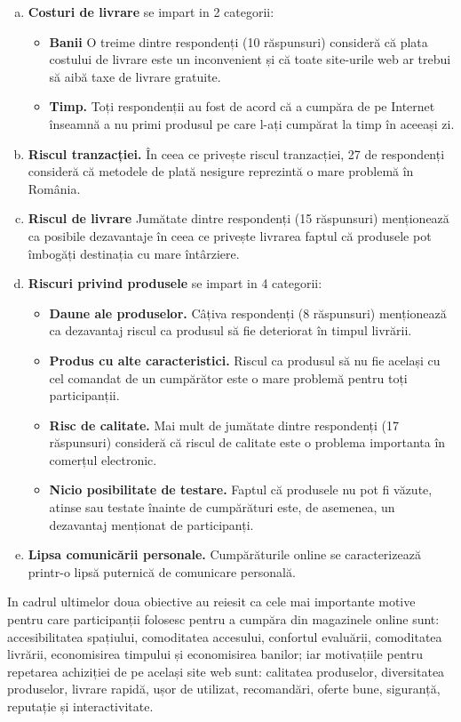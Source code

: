 \documentclass[a4paper, 12pt]{article}
\begin{document}
	\begin{enumerate}[a.]
		\item \textbf {Costuri de livrare} se impart in 2 categorii:
	\begin{itemize}
		\item\textbf{Banii} O treime dintre respondenți (10 răspunsuri) consideră că plata costului de livrare este un inconvenient și că toate site-urile web ar trebui să aibă taxe de livrare gratuite.
		\item\textbf{Timp.} Toți respondenții au fost de acord că a cumpăra de pe Internet înseamnă a nu primi produsul pe care l-ați cumpărat la timp în aceeași zi.
	\end{itemize}
	\item\textbf{Riscul tranzacției.} În ceea ce privește riscul tranzacției, 27 de respondenți consideră că metodele de plată nesigure reprezintă o mare problemă în România.
	\item\textbf {Riscul de livrare}
		Jumătate dintre respondenți (15 răspunsuri) menționează ca posibile dezavantaje în ceea ce privește livrarea faptul că produsele pot îmbogăți destinația cu mare întârziere.
	\item\textbf{Riscuri privind produsele} se impart in 4 categorii:
	\begin{itemize}
	\item \textbf{Daune ale produselor.} Câțiva respondenți (8 răspunsuri) menționează ca dezavantaj riscul ca produsul să fie deteriorat în timpul livrării.
	\item\textbf{Produs cu alte caracteristici.} Riscul ca produsul să nu fie același cu cel comandat de un cumpărător este o mare problemă pentru toți participanții.
	\item\textbf{Risc de calitate.} Mai mult de jumătate dintre respondenți (17 răspunsuri) consideră că riscul de calitate este o problema importanta în comerțul electronic.
	\item\textbf{Nicio posibilitate de testare.} Faptul că produsele nu pot fi văzute, atinse sau testate înainte de cumpărături este, de asemenea, un dezavantaj menționat de participanți.
	\end{itemize}
	\item\textbf{Lipsa comunicării personale.}
		Cumpărăturile online se caracterizează printr-o lipsă puternică de comunicare personală.
	\end{enumerate}
		\qquad In cadrul ultimelor doua obiective au reiesit ca cele mai importante motive pentru care participanții folosesc pentru a cumpăra din magazinele online sunt: accesibilitatea spațiului, comoditatea accesului, confortul evaluării, comoditatea livrării, economisirea timpului și economisirea banilor; iar motivațiile pentru repetarea achiziției de pe același site web sunt: calitatea produselor, diversitatea produselor, livrare rapidă, ușor de utilizat, recomandări, oferte bune, siguranță, reputație și interactivitate.
	\newpage 
\end{document}
